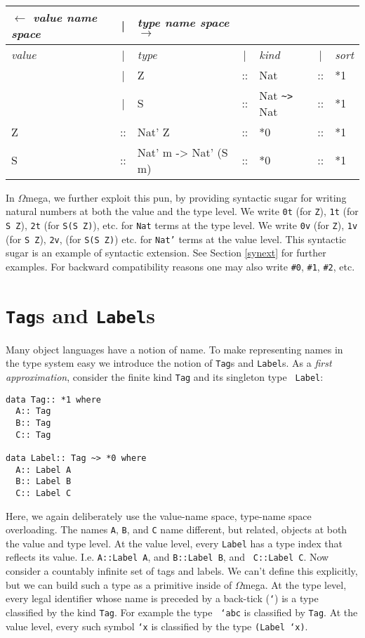 \documentclass[11pt,twoside]{article}
\newcommand{\om}{$\Omega$mega}
\begin{document}
\vspace*{.15in}
{\tt
\begin{tabular}{|lclclcl|} \hline
  $\leftarrow$     {\it {\tiny value name space}}&|& {\it {\tiny type name space $\rightarrow$}} & &  && \\ \hline
{\em value}&|& {\em type} &|&  {\em kind} &|& {\em sort} \\ \hline
     & |& Z        &::& Nat &::& *1 \\
     & |& S        &::& Nat \verb+~>+ Nat &::& *1 \\   \hline  
Z &::& Nat' Z &::& *0 &::& *1 \\
S &::& Nat' m -> Nat' (S m) &::& *0 &::& *1 \\
\hline
\end{tabular}}
\vspace*{.15in}


In \om, we further exploit this pun, by providing syntactic sugar for writing
natural numbers at both the value and the type level. We write {\tt 0t} (for
{\tt Z}), {\tt 1t} (for {\tt S Z}), {\tt 2t} (for {\tt S(S Z)}), etc. for
{\tt Nat} terms at the type level. We write {\tt 0v} (for {\tt Z}), {\tt 1v} 
(for {\tt S Z}), {\tt 2v}, (for {\tt S(S Z)}) etc. for {\tt Nat'} 
terms at the value level. This syntactic sugar is an example of 
syntactic extension. See Section \ref{synext} for further examples.
For backward compatibility reasons one may also write {\tt \#0},
{\tt \#1}, {\tt \#2}, etc.

\section {{\tt Tag}s and {\tt Label}s} \label{tag}

Many object languages have a notion of name. To make representing names in the
type system easy we introduce the notion of {\tt Tag}s and {\tt Label}s. As a {\em first
approximation}, consider the finite kind {\tt Tag} and its singleton type {\tt
Label}:

\begin{verbatim}
data Tag:: *1 where
  A:: Tag
  B:: Tag
  C:: Tag

data Label:: Tag ~> *0 where
  A:: Label A
  B:: Label B
  C:: Label C
\end{verbatim}

Here, we again deliberately use the value-name space, type-name space
overloading. The names {\tt A}, {\tt B}, and {\tt C} name different,
but related, objects at both the value and type level.
At the value level, every {\tt Label} has a type index
that reflects its value. I.e. {\tt A::Label A}, and {\tt B::Label B}, and {\tt
C::Label C}. Now consider a countably infinite set of tags and labels. We can't
define this explicitly, but we can build such a type as a primitive inside of
\om. At the type level, every legal identifier whose name is preceded by a
back-tick ({\tt `}) is a type classified by the kind {\tt Tag}. For example the type {\tt
`abc} is classified by {\tt Tag}. At the value level, every such symbol {\tt `x} is classified
by the type {\tt (Label `x)}.
\end{document}
